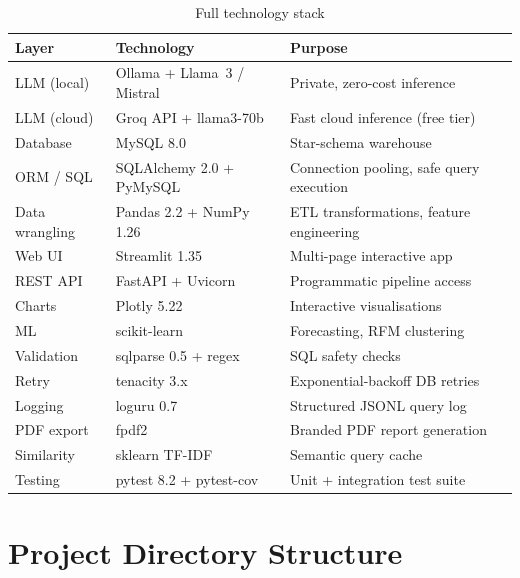 \documentclass[12pt,a4paper]{report}
\begin{document}
\begin{table}[H]
  \centering
  \caption{Full technology stack}
  \label{tab:stack}
  \renewcommand{\arraystretch}{1.3}
  \begin{tabularx}{\textwidth}{llX}
    \toprule
    \textbf{Layer} & \textbf{Technology} & \textbf{Purpose} \\
    \midrule
    LLM (local)   & Ollama + Llama~3 / Mistral & Private, zero-cost inference \\
    LLM (cloud)   & Groq API + llama3-70b       & Fast cloud inference (free tier) \\
    Database       & MySQL 8.0                   & Star-schema warehouse \\
    ORM / SQL      & SQLAlchemy 2.0 + PyMySQL    & Connection pooling, safe query execution \\
    Data wrangling & Pandas 2.2 + NumPy 1.26     & ETL transformations, feature engineering \\
    Web UI         & Streamlit 1.35              & Multi-page interactive app \\
    REST API       & FastAPI + Uvicorn           & Programmatic pipeline access \\
    Charts         & Plotly 5.22                 & Interactive visualisations \\
    ML             & scikit-learn                & Forecasting, RFM clustering \\
    Validation     & sqlparse 0.5 + regex        & SQL safety checks \\
    Retry          & tenacity 3.x                & Exponential-backoff DB retries \\
    Logging        & loguru 0.7                  & Structured JSONL query log \\
    PDF export     & fpdf2                       & Branded PDF report generation \\
    Similarity     & sklearn TF-IDF              & Semantic query cache \\
    Testing        & pytest 8.2 + pytest-cov     & Unit + integration test suite \\
    \bottomrule
  \end{tabularx}
\end{table}

\section{Project Directory Structure}
\end{document}
